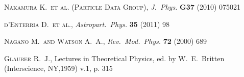 \documentclass[TOTEM]{cern/cernphprep}
\def\etal{et al.}
\def\Name#1{\textsc{#1}, }
\def\REVIEW#1#2#3#4{{\it #1} {\bf #2} (#3) #4}
\begin{document}
\begin{thebibliography}{00}
	\Name{Nakamura K.~\etal{} (Particle Data Group)}
	\REVIEW{J.~Phys.}{G37}{2010}{075021}

	\Name{d'Enterria D.~\etal}
	\REVIEW{Astropart.~Phys.}{35}{2011}{98}

	\Name{Nagano M.~and Watson A.~A.}
	\REVIEW{Rev.~Mod.~Phys.}{72}{2000}{689}

	\Name{Glauber R.~J.}
	Lectures in Theoretical Physics, ed. by W.~E.~Britten (Interscience, NY,1959) v.1, p. 315

\end{thebibliography}
\end{document}
